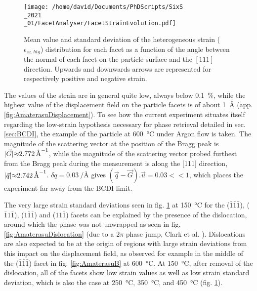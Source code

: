 \begin{figure}[!htb]
    \centering
    \texttt{[image: /home/david/Documents/PhDScripts/SixS\\\_2021\\\_01/FacetAnalyser/FacetStrainEvolution.pdf]}
    \caption{
        Mean value and standard deviation of the heterogeneous strain ($\epsilon_{zz, htg}$) distribution for each facet as a function of the angle between the normal of each facet on the particle surface and the $[111]$ direction.
        Upwards and downwards arrows are represented for respectively positive and negative strain.
    }
    \label{fig:AmaterasuStrain}
\end{figure}

The values of the strain are in general quite low, always below \qty{0.1}{\percent}, while the highest value of the displacement field on the particle facets is of about \qty{1}{\angstrom} (app. \ref{fig:AmaterasuDisplacement}).
To see how the current experiment situates itself regarding the low-strain hypothesis necessary for phase retrieval detailed in sec. \ref{sec:BCDI}, the example of the particle at \qty{600}{\degreeCelsius} under Argon flow is taken.
The magnitude of the scattering vector at the position of the Bragg peak is $|\vec{G}| \qty{\approx 2.772}{\per\angstrom}$, while the magnitude of the scattering vector probed furthest from the Bragg peak during the measurement is along the [111] direction, $|\vec{q}| \qty{\approx 2.742}{\per\angstrom}$.
$\delta q = \qty{0.03}{\per\angstrom}$ gives $(\vec{q}-\vec{G}).\vec{u} = 0.03 <<1$, which places the experiment far away from the BCDI limit.

The very large strain standard deviations seen in fig. \ref{fig:AmaterasuStrain} at \qty{150}{\degreeCelsius} for the ($\bar{1}\bar{1}\bar{1}$), ($\bar{1}1\bar{1}$), ($1\bar{1}\bar{1}$) and ($11\bar{1}$) facets can be explained by the presence of the dislocation, around which the phase was not unwrapped as seen in fig. \ref{fig:AmaterasuDislocation} (due to a $2\pi$ phase jump, Clark et al. \cite*{Clark2015}).
Dislocations are also expected to be at the origin of regions with large strain deviations from this impact on the displacement field, as observed for example in the middle of the ($\bar{1}\bar{1}\bar{1}$) facet in fig. \ref{fig:AmaterasuB} at \qty{600}{\degreeCelsius}.
At \qty{150}{\degreeCelsius}, after removal of the dislocation, all of the facets show low strain values as well as low strain standard deviation, which is also the case at \qty{250}{\degreeCelsius}, \qty{350}{\degreeCelsius}, and \qty{450}{\degreeCelsius} (fig. \ref{fig:AmaterasuStrain}).

